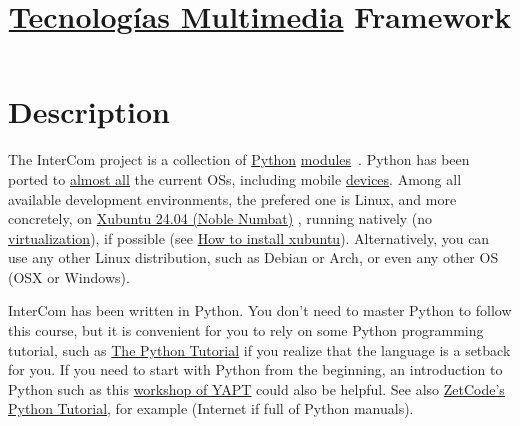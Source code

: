 
\title{\href{https://tecnologias-multimedia.github.io/}{Tecnologías Multimedia} \newline Framework}

\maketitle

\section{Description}

The InterCom project \cite{intercom} is a collection of
\href{https://www.python.org/}{Python}
\href{https://docs.python.org/3/tutorial/modules.html#modules}{modules}~\cite{python}.
Python has been ported to
\href{https://www.python.org/download/other/}{almost all} the current
OSs, including mobile \href{https://kivy.org/#home}{devices}. Among
all available development environments, the prefered one is Linux, and
more concretely, on \href{https://xubuntu.org/download/}{Xubuntu 24.04
  (Noble Numbat)} \cite{xubuntu}, running natively (no
\href{https://en.wikipedia.org/wiki/Virtualization}{virtualization}),
if possible (see
\href{https://vicente-gonzalez-ruiz.github.io/Xubuntu_install/}{How to
  install xubuntu}). Alternatively, you can use any other Linux
distribution, such as Debian or Arch, or even any other OS (OSX or
Windows).

InterCom has been written in Python. You don't need to master Python
to follow this course, but it is convenient for you to rely on some
Python programming tutorial, such as
\href{https://docs.python.org/3/tutorial/}{The Python Tutorial}
\cite{python-tutorial} if you realize that the language is a setback
for you. If you need to start with Python from the beginning, an
introduction to Python such as this
\href{https://github.com/vicente-gonzalez-ruiz/YAPT/tree/master/workshops/programacion_python_ESO}{workshop
  of YAPT} \cite{YAPT} could also be helpful. See also
\href{http://zetcode.com/lang/python/}{ZetCode's Python Tutorial}, for
example (Internet if full of Python manuals).

